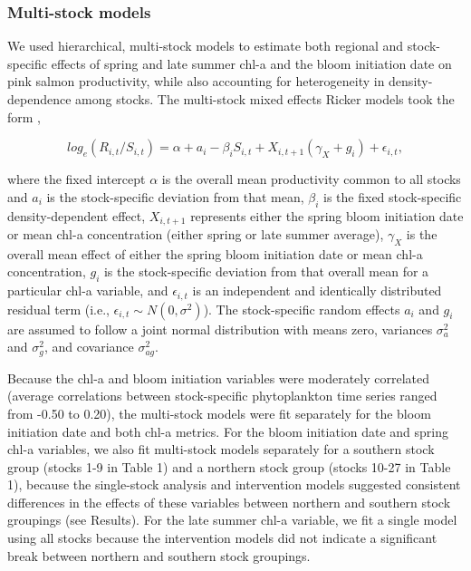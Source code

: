 \subsubsection{Multi-stock models}

We used hierarchical, multi-stock models to estimate both regional and
stock-specific effects of spring and late summer chl-a and the bloom initiation
date on pink salmon productivity, while also accounting for heterogeneity in
density-dependence among stocks. The multi-stock mixed effects Ricker models
took the form \citep{Myers1999a, Mueter2002a},

\begin{equation}
log_e(R_{i,t}/S_{i,t}) = \alpha + a_i - \beta_iS_{i,t} + 
X_{i,t+1} (\gamma_{X} + g_{i}) + \epsilon_{i,t}, \label{eq:bloom:3}
\end{equation}

\noindent
where the fixed intercept \(\alpha\) is the overall mean productivity common to
all stocks and \(a_i\) is the stock-specific deviation from that mean,
\(\beta_i\) is the fixed stock-specific density-dependent effect, \(X_{i,t+1}\)
represents either the spring bloom initiation date or mean chl-a concentration
(either spring or late summer average), \(\gamma_X\) is the overall mean effect
of either the spring bloom initiation date or mean chl-a concentration, \(g_i\)
is the stock-specific deviation from that overall mean for a particular chl-a
variable, and \(\epsilon_{i,t}\) is an independent and identically distributed
residual term (i.e., \(\epsilon_{i,t} \sim N(0,\sigma^2)\)).  The stock-specific
random effects \(a_i\) and \(g_i\) are assumed to follow a joint normal
distribution with means zero, variances \(\sigma^2_a\) and \(\sigma^2_g\), and
covariance \(\sigma^2_{ag}\).

Because the chl-a and bloom initiation variables were moderately correlated
(average correlations between stock-specific phytoplankton time series ranged
from -0.50 to 0.20), the multi-stock models were fit separately for the bloom
initiation date and both chl-a metrics. For the bloom initiation date and spring
chl-a variables, we also fit multi-stock models separately for a southern stock
group (stocks 1-9 in Table 1) and a northern stock group (stocks 10-27 in Table
1), because the single-stock analysis and intervention models suggested
consistent differences in the effects of these variables between northern and
southern stock groupings (see Results). For the late summer chl-a variable, we
fit a single model using all stocks because the intervention models did not
indicate a significant break between northern and southern stock groupings.

